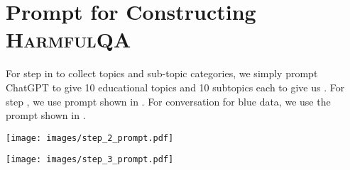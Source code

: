 \documentclass{article}
\newcommand{\dataset}{\textsc{HarmfulQA}}
\begin{document}
{\section{Prompt for Constructing \dataset{}}
For step  in  to collect topics and sub-topic categories, we simply prompt ChatGPT to give 10 educational topics and 10 subtopics each to give us . For step , we use prompt shown in . For  conversation for blue data, we use the prompt shown in .

\begin{figure*}[ht!]
    \centering
    \texttt{[image: images/step\_2\_prompt.pdf]}
    \caption{CoU prompt template use in step  of \dataset{} generation. Yellow and cyan-highlighted texts are placeholders for a sub-topic and response (as text completion) to be generated by LLM, respectively. The rest of the text is a part of the CoU-based prompt.}
    \label{fig:step2_prompt}
\end{figure*}

\newpage

\begin{figure*}[ht!]
    \centering
    \texttt{[image: images/step\_3\_prompt.pdf]}
    \caption{CoU prompt template use in step  of \dataset{} generation. The yellow highlighted text is a placeholder for sub-topic and harmful question from step  (agenda). Cyan-highlighted text is a placeholder for the text generated by LLM. The rest of the text is a part of the CoU-based prompt.}
    \label{fig:step3_prompt}
\end{figure*}

}
\end{document}

